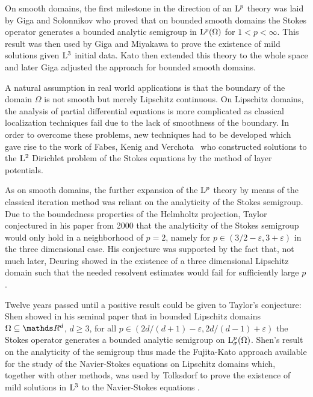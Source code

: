 On smooth domains, the first milestone in the direction of an $\mathrm{L}^p$ theory was laid by Giga \cite{giga} and Solonnikov \cite{solonnikov} who proved that on bounded smooth domains the Stokes operator generates a bounded analytic semigroup in $\mathrm{L}^p(\Omega)$ for $1 < p < \infty$.
This result was then used by Giga and Miyakawa \cite{gigaMiyakawa} to prove the existence of mild solutions given $\mathrm{L}^3$ initial data.
Kato \cite{katoExtend} then extended this theory to the whole space and later Giga \cite{gigaAdjust} adjusted the approach for bounded smooth domains.

A natural assumption in real world applications is that the boundary of the domain $\Omega$ is not smooth but merely Lipschitz continuous. 
On Lipschitz domains, the analysis of partial differential equations is more complicated as classical localization techniques fail due to the lack of smoothness of the boundary.
In order to overcome these problems, new techniques had to be developed which gave rise to the work of Fabes, Kenig and Verchota~\cite{fabesKenigVerchota} who constructed solutions to the $\mathrm{L}^2$ Dirichlet problem of the Stokes equations by the method of layer potentials.

As on smooth domains, the further expansion of the $\mathrm{L}^p$ theory by means of the classical iteration method was reliant on the analyticity of the Stokes semigroup.
Due to the boundedness properties of the Helmholtz projection, Taylor conjectured in his paper \cite{taylor} from 2000 that the analyticity of the Stokes semigroup would only hold in a neighborhood of $p = 2$, namely for $p \in  (3/2 - \varepsilon, 3 + \varepsilon)$ in the three dimensional case.
His conjecture was supported by the fact that, not much later, Deuring showed in \cite{deuring} the existence of a three dimensional Lipschitz domain such that the needed resolvent estimates would fail for sufficiently large $p$.

Twelve years passed until a positive result could be given to Taylor's conjecture:  Shen showed in his seminal paper \cite{Shen2012} that in bounded Lipschitz domains $\Omega \subseteq \R^d$, $d \geq 3$, for all $p \in (2d/( d + 1) - \varepsilon , 2d/(d - 1) + \varepsilon)$ the Stokes operator generates a bounded analytic semigroup on $\mathrm{L}^p_\sigma(\Omega)$.
Shen's result on the analyticity of the semigroup thus made the Fujita-Kato approach available for the study of the Navier-Stokes equations on Lipschitz domains which, together with other methods, was used by Tolksdorf to prove the existence of mild solutions in $\mathrm{L}^3$ to the Navier-Stokes equations \cite{tolksdorf}.

